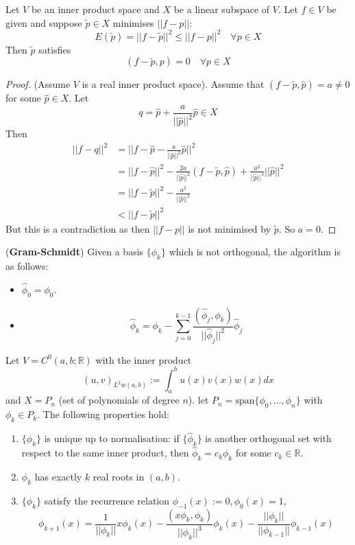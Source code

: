 \begin{theorem}
	Let $V$ be an inner product space and $X$ be a linear subspace of $V$. Let $f \in V$ be given and suppose $\tilde{p} \in X$ minimises $||f - p||$:
	\[
		E(\tilde{p}) = ||f - \tilde{p}||^2 \le ||f - p||^2 \quad \forall p \in X
	\]
	Then $\tilde{p}$ satisfies
	\[
		(f - \tilde{p}, p) = 0 \quad \forall p \in X
	\]
\end{theorem}

\begin{proof}
	(Assume $V$ is a real inner product space). Assume that $(f - \tilde{p}, \hat{p}) = a \ne 0$ for some $\hat{p} \in X$. Let
	\[
		q = \hat{p} + \frac{a}{||\hat{p}||^2} \hat{p} \in X
	\]
	Then
	\[
		\begin{aligned}
			||f - q||^2 & = ||f - \hat{p} - \frac{a}{||\hat{p}||^2} \hat{p}||^2 \\
			& = ||f - \hat{p}||^2 - \frac{2a}{||\hat{p}||^2} (f - \tilde{p}, \hat{p}) + \frac{a^2}{||\hat{p}||^4} ||\hat{p}||^2 \\
			& = ||f - \tilde{p}||^2 - \frac{a^2}{||\hat{p}||^2} \\
			& < ||f - \tilde{p}||^2
		\end{aligned}
	\]
	But this is a contradiction as then $||f - p||$ is not minimised by $\tilde{p}$. So $a = 0$.
\end{proof}

\begin{definition}
	(\textbf{Gram-Schmidt}) Given a basis $\{ \phi_k \}$ which is not orthogonal, the algorithm is as follows:
	\begin{itemize}
		\item $\hat{\phi}_0 = \phi_0$.
		\item \[
			\hat{\phi}_k = \phi_k - \sum_{j = 0}^{k - 1} \frac{(\hat{\phi}_j, \phi_k)}{||\hat{\phi}_j||^2} \hat{\phi}_j
		\]
	\end{itemize}
\end{definition}

\begin{proposition}
	Let $V = C^0 (a, b; \mathbb{R})$ with the inner product
	\[
		{(u, v)}_{L^2 w(a, b)} := \int_{a}^{b} u(x) v(x) w(x) dx
	\]
	and $X = P_n$ (set of polynomials of degree $n$). let $P_n = \text{span}\{ \phi_0, \dots, \phi_n \}$ with $\phi_k \in P_k$. The following properties hold:
	\begin{enumerate}
		\item $\{ \phi_k \}$ is unique up to normalisation: if $\{ \hat{\phi}_k \}$ is another orthogonal set with respect to the same inner product, then $\hat{\phi}_k = c_k \phi_k$ for some $c_k \in \mathbb{R}$.
		\item $\phi_k$ has exactly $k$ real roots in $(a, b)$.
		\item $\{ \phi_k \}$ satisfy the recurrence relation $\phi_{-1} (x) := 0, \phi_0(x) = 1$,
		\[
			\phi_{k + 1} (x) = \frac{1}{||\phi_k||} x \phi_k(x) - \frac{(x \phi_k, \phi_k)}{||\phi_k||^3} \phi_k(x) - \frac{||\phi_k||}{||\phi_{k - 1}||} \phi_{k - 1}(x)
		\]
	\end{enumerate}
\end{proposition}

